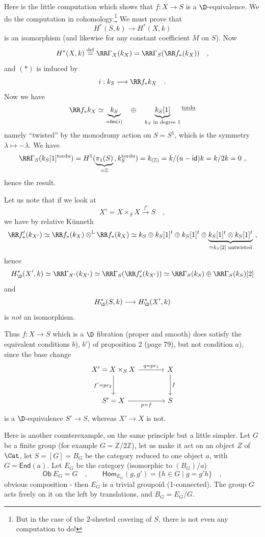 Here is the little computation which shows that $f : X \to S$ is a $\D$-equivalence. We do the computation in cohomology.\footnote[46]{But in the case of the 2-sheeted covering of $S$, there is not even any computation to do!} We must prove that
\[ H^*(S,k) \longrightarrow H^*(X,k) \tag*{$(*)$} \]
is an isomorphism (and likewise for any constant coefficient $M$ on $S$). Now
\[ H^*(X,k) \overset{\mathrm{def}}{=} \RR\Gamma_X(k_X) = \RR\Gamma_S(\RR f_*(k_X)) \quad , \]
and $(*)$ is induced by
\[ i : k_S \longrightarrow \RR f_* k_X \quad . \]
Now we have
\[ \RR f_* k_X \simeq \underbrace{k_S}_{= \mathsf{Im}(i)} \quad \oplus \quad \underbrace{k_S[1]}_{k_S \text{ in degree } 1}{}^{\underline{\mathrm{tordu}}} \]
namely ``twisted'' by the monodromy action on $S = S^1$, which is the symmetry $\lambda \mapsto -\lambda$. We have
\[ \RR\Gamma_S(k_S[1]^{\mathrm{tordu}}) = H^1(\underbrace{\pi_1(S)}_{= \mathbb{Z}}\, , k_S^{\mathrm{tordu}}) = k_{(\mathbb{Z})} = k/(u - \mathsf{id})k = k/2k = 0 \ , \]
hence the result.

Let us note that if we look at
\[ X' = X \times_S X \xrightarrow{f'} S \quad , \]
we have by relative Künneth
\[ \RR f'_*(k_{X'}) \simeq \RR f_*(k_X) \otimes^{\mathbb{L}} \RR f_*(k_X) \simeq k_S \oplus k_S[1]^t \oplus k_S[1]^t \oplus \underbrace{k_S[1]^t \otimes k_S[1]^t}_{\simeq k_S[2] \text{ untwisted}} \ , \]
hence
\[ H^*_{\D}(X',k) \simeq \RR\Gamma_{X'}(k_{X'}) \simeq \RR\Gamma_S(\RR f'_*(k_{X'})) \simeq \RR\Gamma_S(k_S) \oplus \RR\Gamma_S(k_S)[2] \]
and
\[ H^*_{\D}(S,k) \longrightarrow H^*_{\D}(X',k) \]
is \textit{not} an isomorphism.

Thus $f : X \to S$ which is a $\D$ fibration (proper and smooth) does satisfy the equivalent conditions $b$), $b'$) of proposition 2 (page 79), but not condition $a$), since the base change
\[
\begin{tikzcd}[column sep=large, row sep=large]
X' = X \times_S X \arrow[r, "{q = pr_1}"] \arrow[d, "{f' = pr_2}"'] & X \arrow[d, "f"] \\
S' = X \arrow[r, "{p = f}"'] & S
\end{tikzcd}
\]
is a $\D$-equivalence $S' \to S$, whereas $X' \to X$ is not.

Here is another counterexample, on the same principle but a little simpler. Let $G$ be a finite group (for example $G = \mathbb{Z}/2\mathbb{Z}$), let us make it act on an object $Z$ of $\Cat$, let $S = [G] = B_G$ be the category reduced to one object $a$, with $G = \mathsf{End}(a)$. Let $E_G$ be the category (isomorphic to $(B_G)/a$)
\[ \mathsf{Ob}\ E_G = G \quad , \qquad \mathsf{Hom}_{E_G}(g,g') = \{ h \in G \mid g = g'h \} \quad , \]
obvious composition - then $E_G$ is a trivial groupoid (1-connected). The group $G$ acts freely on it on the left by translations, and $B_G = E_G/G$. %

